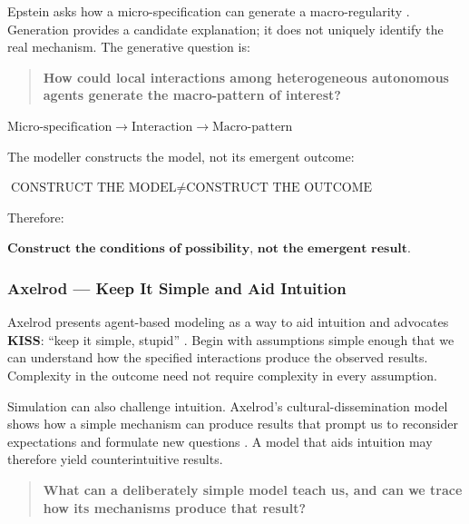 \documentclass[11pt,a4paper]{article}
\newenvironment{fitdisplay}{\par\medskip\noindent\begin{lrbox}{\displaybox}$\displaystyle}{%
$\end{lrbox}\makebox[\linewidth][c]{\ifdim\wd\displaybox>\linewidth\resizebox{\linewidth}{!}{\usebox{\displaybox}}\else\usebox{\displaybox}\fi}\par\medskip}
\begin{document}
Epstein asks how a micro-specification can generate a macro-regularity \cite[pp.~41--43]{epstein}. Generation provides a candidate explanation; it does not uniquely identify the real mechanism. The generative question is:

\begin{quote}
\textbf{How could local interactions among heterogeneous autonomous agents generate the macro-pattern of interest?}
\end{quote}

\begin{fitdisplay}
\boxed{
\text{Micro-specification}
\rightarrow
\text{Interaction}
\rightarrow
\text{Macro-pattern}
}
\end{fitdisplay}

The modeller constructs the model, not its emergent outcome:

\begin{fitdisplay}
\boxed{
\text{CONSTRUCT THE MODEL}
\neq
\text{CONSTRUCT THE OUTCOME}
}
\end{fitdisplay}

Therefore:

\begin{fitdisplay}
\boxed{\textbf{Construct the conditions of possibility, not the emergent result.}}
\end{fitdisplay}

\subsubsection{Axelrod --- Keep It Simple and Aid Intuition}
\label{sec:axelrod-foundation}

Axelrod presents agent-based modeling as a way to aid intuition and advocates \textbf{KISS}: ``keep it simple, stupid'' \cite[pp.~4--6]{axelrod_complexity_1997}. Begin with assumptions simple enough that we can understand how the specified interactions produce the observed results. Complexity in the outcome need not require complexity in every assumption.

Simulation can also challenge intuition. Axelrod's cultural-dissemination model shows how a simple mechanism can produce results that prompt us to reconsider expectations and formulate new questions \cite[pp.~219--220]{axelrod_dissemination_1997}. A model that aids intuition may therefore yield counterintuitive results.

\begin{quote}
\textbf{What can a deliberately simple model teach us, and can we trace how its mechanisms produce that result?}
\end{quote}
\end{document}
